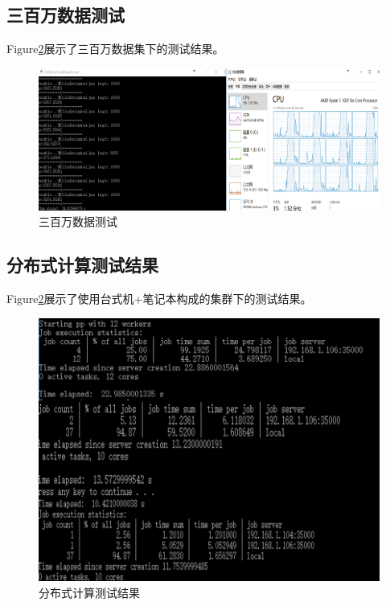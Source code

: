 \subsection{三百万数据测试}
Figure\ref{fig:sys.param}展示了三百万数据集下的测试结果。
\begin{figure}[H]
\begin{center}
\includegraphics[width=16cm]{img//3million.PNG}
\caption{三百万数据测试}
\label{fig:sys.param}
\end{center}
\end{figure}

\subsection{分布式计算测试结果}
Figure\ref{fig:sys.param}展示了使用台式机+笔记本构成的集群下的测试结果。
\begin{figure}[H]
\begin{center}
\includegraphics[width=16cm]{img//distribution.PNG}
\caption{分布式计算测试结果}
\label{fig:sys.param}
\end{center}
\end{figure}